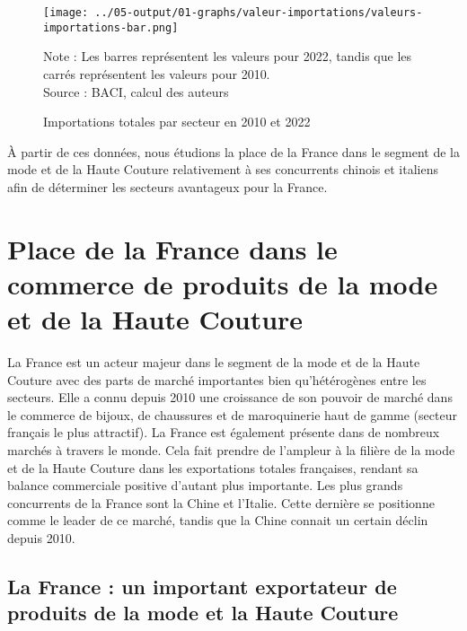 \documentclass[french,10pt,a4paper]{article}
\begin{document}
\begin{figure}[!h]
  \centering
  \texttt{[image: ../05-output/01-graphs/valeur-importations/valeurs-importations-bar.png]}
  \caption*{Note : Les barres représentent les valeurs pour 2022, tandis que les carrés représentent les valeurs pour 2010. \\
  Source : BACI, calcul des auteurs}
  \captionsetup{justification=centering, singlelinecheck=true, font=normalsize}
  \caption{Importations totales par secteur en 2010 et 2022}
  \label{fig:valeurs-importations}
\end{figure}

\bigskip

À partir de ces données, nous étudions la place de la France dans le segment de la mode et de la Haute Couture relativement à ses concurrents chinois et italiens afin de déterminer les secteurs avantageux pour la France.






\newpage

\section{Place de la France dans le commerce de produits de la mode et de la Haute Couture}

La France est un acteur majeur dans le segment de la mode et de la Haute Couture avec des parts de marché importantes bien qu'hétérogènes entre les secteurs. Elle a connu depuis 2010 une croissance de son pouvoir de marché dans le commerce de bijoux, de chaussures et de maroquinerie haut de gamme (secteur français le plus attractif). La France est également présente dans de nombreux marchés à travers le monde. Cela fait prendre de l'ampleur à la filière de la mode et de la Haute Couture dans les exportations totales françaises, rendant sa balance commerciale positive d'autant plus importante. Les plus grands concurrents de la France sont la Chine et l'Italie. Cette dernière se positionne comme le leader de ce marché, tandis que la Chine connait un certain déclin depuis 2010.

\subsection{La France : un important exportateur de produits de la mode et la Haute Couture}
\end{document}

